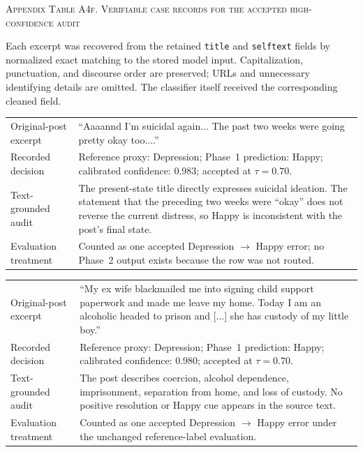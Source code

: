 \documentclass{ieeeaccess}
\begin{document}
\par\medskip
{}
\noindent\textsc{Appendix Table A4f. Verifiable case records for the accepted high-confidence audit}\par
\label{tab:appendix-a4f-accepted-error-records}
\smallskip
\noindent\footnotesize Each excerpt was recovered from the retained \texttt{title} and \texttt{selftext} fields by normalized exact matching to the stored model input. Capitalization, punctuation, and discourse order are preserved; URLs and unnecessary identifying details are omitted. The classifier itself received the corresponding cleaned field.\normalsize

\par\smallskip
\noindent\begin{tabularx}{\textwidth}{@{}>{\raggedright\arraybackslash}p{}Y@{}}
\toprule
{} \\
\midrule
Original-post excerpt & ``Aaaannd I'm suicidal again... The past two weeks were going pretty okay too....'' \\
Recorded decision & Reference proxy: Depression; Phase~1 prediction: Happy; calibrated confidence: 0.983; accepted at $\tau=0.70$. \\
Text-grounded audit & The present-state title directly expresses suicidal ideation. The statement that the preceding two weeks were ``okay'' does not reverse the current distress, so Happy is inconsistent with the post's final state. \\
Evaluation treatment & Counted as one accepted Depression $\rightarrow$ Happy error; no Phase~2 output exists because the row was not routed. \\
\bottomrule
\end{tabularx}

\par\medskip
\noindent\begin{tabularx}{\textwidth}{@{}>{\raggedright\arraybackslash}p{}Y@{}}
\toprule
{} \\
\midrule
Original-post excerpt & ``My ex wife blackmailed me into signing child support paperwork and made me leave my home. Today I am an alcoholic headed to prison and [...] she has custody of my little boy.'' \\
Recorded decision & Reference proxy: Depression; Phase~1 prediction: Happy; calibrated confidence: 0.980; accepted at $\tau=0.70$. \\
Text-grounded audit & The post describes coercion, alcohol dependence, imprisonment, separation from home, and loss of custody. No positive resolution or Happy cue appears in the source text. \\
Evaluation treatment & Counted as one accepted Depression $\rightarrow$ Happy error under the unchanged reference-label evaluation. \\
\bottomrule
\end{tabularx}
\end{document}
